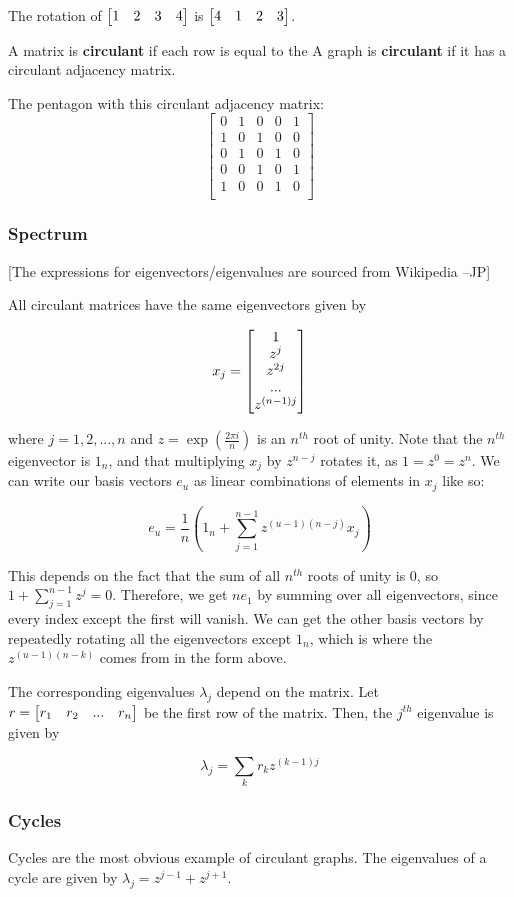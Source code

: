 \begin{example}
  The rotation of $\begin{bmatrix}1 & 2 & 3 & 4 \end{bmatrix}$ is $\begin{bmatrix}4 & 1 & 2 & 3 \end{bmatrix}$.
\end{example}

\begin{definition}
  A matrix is {\bf circulant} if each row is equal to the A graph is {\bf
    circulant} if it has a circulant adjacency matrix.
\end{definition}

\begin{example}
  The pentagon with this circulant adjacency matrix:
  \[
    \begin{bmatrix}
      0 & 1 & 0 & 0 & 1 \\
      1 & 0 & 1 & 0 & 0 \\
      0 & 1 & 0 & 1 & 0 \\
      0 & 0 & 1 & 0 & 1 \\
      1 & 0 & 0 & 1 & 0 \\
    \end{bmatrix}
  \]
\end{example}

\subsubsection*{Spectrum}

[The expressions for eigenvectors/eigenvalues are sourced from Wikipedia --JP]

All circulant matrices have the same eigenvectors given by

\[x_j = \begin{bmatrix}1 \\ z^j \\ z^{2j} \\ ... \\ z^{(n-1)j} \end{bmatrix}\]

where $j=1,2,...,n$ and $z=\exp(\frac{2 \pi i}{n})$ is an $n^{th}$ root of
unity. Note that the $n^{th}$ eigenvector is $1_n$, and that multiplying $x_j$
by $z^{n-j}$ rotates it, as $1 = z^0 = z^n$. We can write our basis vectors $e_u$ as
linear combinations of elements in $x_j$ like so:

\[e_u = \frac{1}{n}(1_n + \sum^{n-1}_{j=1} z^{(u-1)(n-j)} x_j)\]

This depends on the fact that the sum of all $n^{th}$ roots of unity is 0, so
$1 + \sum_{j=1}^{n-1}z^j = 0$. Therefore, we get $ne_1$ by summing over all
eigenvectors, since every index except the first will vanish. We can get the
other basis vectors by repeatedly rotating all the eigenvectors except $1_n$,
which is where the $z^{(u-1)(n-k)}$ comes from in the form above.

The corresponding eigenvalues $\lambda_j$ depend on the matrix. Let
$r = \begin{bmatrix}r_1 & r_2 & ... & r_n \end{bmatrix}$ be the first row of the matrix. Then, the
$j^{th}$ eigenvalue is given by

\[\lambda_j = \sum_{k}r_kz^{(k-1)j} \]


\subsubsection*{Cycles}

Cycles are the most obvious example of circulant graphs. The eigenvalues of a
cycle are given by $\lambda_j = z^{j-1} + z^{j+1}$.
